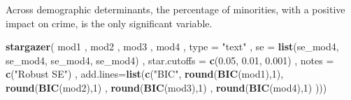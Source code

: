 \documentclass[]{article}
\newenvironment{Shaded}{\begin{snugshade}}{\end{snugshade}}
\newcommand{\DataTypeTok}[1]{\textcolor[rgb]{0.13,0.29,0.53}{#1}}
\newcommand{\DecValTok}[1]{\textcolor[rgb]{0.00,0.00,0.81}{#1}}
\newcommand{\FloatTok}[1]{\textcolor[rgb]{0.00,0.00,0.81}{#1}}
\newcommand{\KeywordTok}[1]{\textcolor[rgb]{0.13,0.29,0.53}{\textbf{#1}}}
\newcommand{\NormalTok}[1]{#1}
\newcommand{\StringTok}[1]{\textcolor[rgb]{0.31,0.60,0.02}{#1}}
\begin{document}
Across demographic determinants, the percentage of minorities, with a
positive impact on crime, is the only significant variable.

\begin{Shaded}
\begin{Highlighting}[]
\KeywordTok{stargazer}\NormalTok{(}
\NormalTok{    mod1}
\NormalTok{  , mod2}
\NormalTok{  , mod3}
\NormalTok{  , mod4}
\NormalTok{  , }\DataTypeTok{type =} \StringTok{"text"}
\NormalTok{  , }\DataTypeTok{se =} \KeywordTok{list}\NormalTok{(se_mod4, se_mod4, se_mod4, se_mod4)}
\NormalTok{  , }\DataTypeTok{star.cutoffs =} \KeywordTok{c}\NormalTok{(}\FloatTok{0.05}\NormalTok{, }\FloatTok{0.01}\NormalTok{, }\FloatTok{0.001}\NormalTok{)}
\NormalTok{  , }\DataTypeTok{notes =} \KeywordTok{c}\NormalTok{(}\StringTok{"Robust SE"}\NormalTok{)}
\NormalTok{  , }\DataTypeTok{add.lines=}\KeywordTok{list}\NormalTok{(}\KeywordTok{c}\NormalTok{(}\StringTok{"BIC"}\NormalTok{, }\KeywordTok{round}\NormalTok{(}\KeywordTok{BIC}\NormalTok{(mod1),}\DecValTok{1}\NormalTok{), }\KeywordTok{round}\NormalTok{(}\KeywordTok{BIC}\NormalTok{(mod2),}\DecValTok{1}\NormalTok{) , }\KeywordTok{round}\NormalTok{(}\KeywordTok{BIC}\NormalTok{(mod3),}\DecValTok{1}\NormalTok{) , }\KeywordTok{round}\NormalTok{(}\KeywordTok{BIC}\NormalTok{(mod4),}\DecValTok{1}\NormalTok{)}
\NormalTok{                     )))}
\end{Highlighting}
\end{Shaded}
\end{document}
